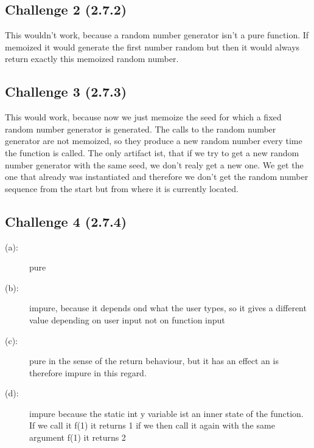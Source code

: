 \documentclass[11pt]{article}
\begin{document}
    \subsection*{Challenge 2 (2.7.2)}
        This wouldn't work, because a random number generator isn't a pure function. If memoized it would generate the first number random but then it would always return exactly this memoized random number.

    \subsection*{Challenge 3 (2.7.3)}
        This would work, because now we just memoize the seed for which a fixed random number generator is generated. The calls to the random number generator are not memoized, so they produce a new random number every time the function is called. The only artifact ist, that if we try to get a new random number generator with the same seed, we don't realy get a new one. We get the one that already was instantiated and therefore we don't get the random number sequence from the start but from where it is currently located.

    \subsection*{Challenge 4 (2.7.4)}
        \begin{description}
            \item[(a):] pure
            \item[(b):] impure, because it depends ond what the user types, so it gives a different value depending on user input not on function input
            \item[(c):] pure in the sense of the return behaviour, but it has an effect an is therefore impure in this regard.
            \item[(d):] impure because the static int y variable ist an inner state of the function. If we call it f(1) it returns 1 if we then call it again with the same argument f(1) it returns 2
        \end{description}
\end{document}
